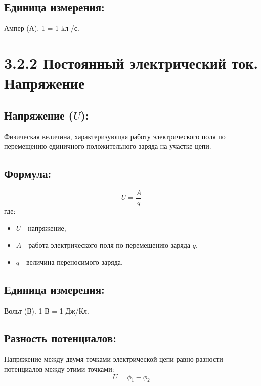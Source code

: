 \documentclass[a4paper,12pt]{article}
\begin{document}
\vspace{-9pt}
\subsection*{Единица измерения:}
\vspace{-3pt}
Ампер (А). 1 = 1 kл /с.
\vspace{-18pt}

\newpage
\section*{3.2.2 Постоянный электрический ток. Напряжение}
\vspace{-9pt}
\subsection*{Напряжение ($U$):}
\vspace{-3pt}
Физическая величина, характеризующая работу электрического поля по перемещению единичного положительного заряда на участке цепи.

\vspace{-9pt}
\subsection*{Формула:}
\vspace{-3pt}
\vspace{-0.05em}
$$ U = \frac{A}{q} $$
где:
\begin{itemize}
    \item $U$ - напряжение,
    \item $A$ - работа электрического поля по перемещению заряда $q$,
    \item $q$ - величина переносимого заряда.
\end{itemize}

\vspace{-9pt}
\subsection*{Единица измерения:}
\vspace{-9pt}
Вольт (В). 1 В = 1 Дж/Кл.
\vspace{-9pt}
\subsection*{Разность потенциалов:}
\vspace{-3pt}
Напряжение между двумя точками электрической цепи равно разности потенциалов между этими точками:
\vspace{-0.05em}
$$ U = \phi_1 - \phi_2 $$
\end{document}
